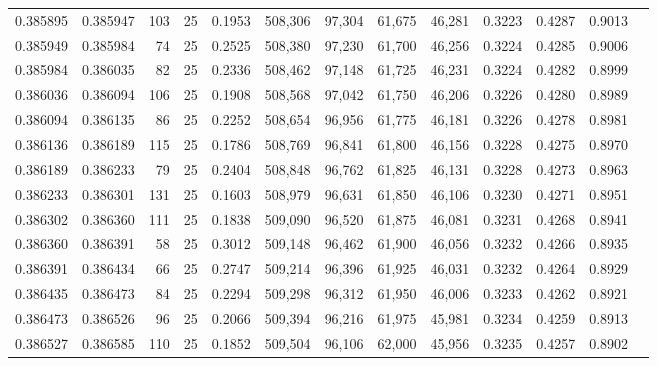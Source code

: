 \begin{tabular}{rrrrrrrrrrrrr}
0.385895 & 0.385947 &   103 &  25 &                                     0.1953 & 508,306 &  97,304 &  61,675 &  46,281 & 0.3223 & 0.4287 & 0.9013 \\
0.385949 & 0.385984 &    74 &  25 &                                     0.2525 & 508,380 &  97,230 &  61,700 &  46,256 & 0.3224 & 0.4285 & 0.9006 \\
0.385984 & 0.386035 &    82 &  25 &                                     0.2336 & 508,462 &  97,148 &  61,725 &  46,231 & 0.3224 & 0.4282 & 0.8999 \\
0.386036 & 0.386094 &   106 &  25 &                                     0.1908 & 508,568 &  97,042 &  61,750 &  46,206 & 0.3226 & 0.4280 & 0.8989 \\
0.386094 & 0.386135 &    86 &  25 &                                     0.2252 & 508,654 &  96,956 &  61,775 &  46,181 & 0.3226 & 0.4278 & 0.8981 \\
0.386136 & 0.386189 &   115 &  25 &                                     0.1786 & 508,769 &  96,841 &  61,800 &  46,156 & 0.3228 & 0.4275 & 0.8970 \\
0.386189 & 0.386233 &    79 &  25 &                                     0.2404 & 508,848 &  96,762 &  61,825 &  46,131 & 0.3228 & 0.4273 & 0.8963 \\
0.386233 & 0.386301 &   131 &  25 &                                     0.1603 & 508,979 &  96,631 &  61,850 &  46,106 & 0.3230 & 0.4271 & 0.8951 \\
0.386302 & 0.386360 &   111 &  25 &                                     0.1838 & 509,090 &  96,520 &  61,875 &  46,081 & 0.3231 & 0.4268 & 0.8941 \\
0.386360 & 0.386391 &    58 &  25 &                                     0.3012 & 509,148 &  96,462 &  61,900 &  46,056 & 0.3232 & 0.4266 & 0.8935 \\
0.386391 & 0.386434 &    66 &  25 &                                     0.2747 & 509,214 &  96,396 &  61,925 &  46,031 & 0.3232 & 0.4264 & 0.8929 \\
0.386435 & 0.386473 &    84 &  25 &                                     0.2294 & 509,298 &  96,312 &  61,950 &  46,006 & 0.3233 & 0.4262 & 0.8921 \\
0.386473 & 0.386526 &    96 &  25 &                                     0.2066 & 509,394 &  96,216 &  61,975 &  45,981 & 0.3234 & 0.4259 & 0.8913 \\
0.386527 & 0.386585 &   110 &  25 &                                     0.1852 & 509,504 &  96,106 &  62,000 &  45,956 & 0.3235 & 0.4257 & 0.8902 \\

\end{tabular}
